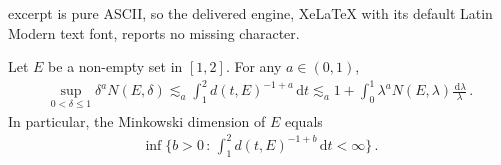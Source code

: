 \documentclass[10pt,a4paper]{amsart}
\newcommand{\dd}{\,\mathrm{d}}
\begin{document}
excerpt is pure ASCII, so the delivered engine, XeLaTeX with its default Latin Modern text font, reports no missing character.
\begin{lemma}\label{231109742}
    Let $E$ be a non-empty set in $[1,2]$.
    For any $a\in(0,1)$, 
    \begin{align}\label{240313416}
        \sup_{0<\delta\leq 1}\delta^a N(E,\delta)\lesssim_a \int_1^2d(t,E)^{-1+a}\dd t\lesssim_a 1+\int_0^1 \lambda^{a}N(E,\lambda)\frac{\dd \lambda}{\lambda}\,.
    \end{align}
    In particular, the Minkowski dimension of $E$ equals
    \begin{align}\label{240409516}
        \inf\Big\{b>0\,:\,\int_1^2d(t,E)^{-1+b}\dd t<\infty\Big\}\,.
    \end{align}
\end{lemma}
\end{document}
